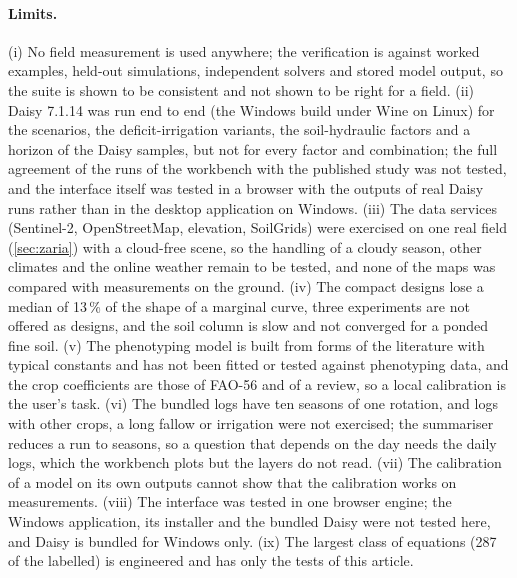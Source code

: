 \documentclass[preprint,12pt]{elsarticle}
\begin{document}
\paragraph{Limits.} (i) No field measurement is used anywhere; the verification is against worked examples, held-out simulations, independent solvers and stored model output, so the suite is shown to be consistent and not shown to be right for a field. (ii) Daisy 7.1.14 was run end to end (the Windows build under Wine on Linux) for the scenarios, the deficit-irrigation variants, the soil-hydraulic factors and a horizon of the Daisy samples, but not for every factor and combination; the full agreement of the runs of the workbench with the published study was not tested, and the interface itself was tested in a browser with the outputs of real Daisy runs rather than in the desktop application on Windows. (iii) The data services (Sentinel-2, OpenStreetMap, elevation, SoilGrids) were exercised on one real field (\cref{sec:zaria}) with a cloud-free scene, so the handling of a cloudy season, other climates and the online weather remain to be tested, and none of the maps was compared with measurements on the ground. (iv) The compact designs lose a median of 13\,\% of the shape of a marginal curve, three experiments are not offered as designs, and the soil column is slow and not converged for a ponded fine soil. (v) The phenotyping model is built from forms of the literature with typical constants and has not been fitted or tested against phenotyping data, and the crop coefficients are those of FAO-56 and of a review, so a local calibration is the user's task. (vi) The bundled logs have ten seasons of one rotation, and logs with other crops, a long fallow or irrigation were not exercised; the summariser reduces a run to seasons, so a question that depends on the day needs the daily logs, which the workbench plots but the layers do not read. (vii) The calibration of a model on its own outputs cannot show that the calibration works on measurements. (viii) The interface was tested in one browser engine; the Windows application, its installer and the bundled Daisy were not tested here, and Daisy is bundled for Windows only. (ix) The largest class of equations (287 of the labelled) is engineered and has only the tests of this article.
\end{document}

